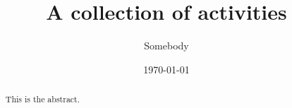 \documentclass{xourse}
\title{A collection of activities}
\author{Somebody}
\date{\today}
\begin{document}
\begin{abstract}
	This is the abstract.
\end{abstract}

\maketitle

\tableofcontents
{}
\end{document}
